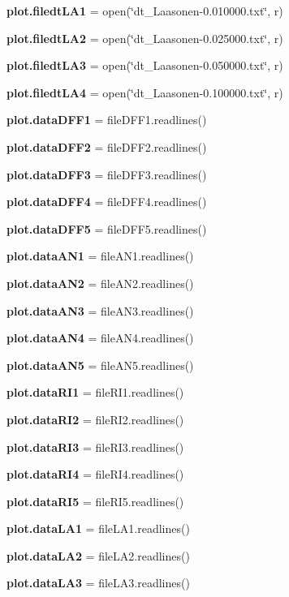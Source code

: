 \begin{DoxyCompactItemize}
\textbf{ plot.\+filedt\+L\+A1} = open(\char`\"{}dt\+\_\+\+Laasonen-\/0.\+010000.txt\char`\"{}, \textquotesingle{}r\textquotesingle{})
\item 
\textbf{ plot.\+filedt\+L\+A2} = open(\char`\"{}dt\+\_\+\+Laasonen-\/0.\+025000.txt\char`\"{}, \textquotesingle{}r\textquotesingle{})
\item 
\textbf{ plot.\+filedt\+L\+A3} = open(\char`\"{}dt\+\_\+\+Laasonen-\/0.\+050000.txt\char`\"{}, \textquotesingle{}r\textquotesingle{})
\item 
\textbf{ plot.\+filedt\+L\+A4} = open(\char`\"{}dt\+\_\+\+Laasonen-\/0.\+100000.txt\char`\"{}, \textquotesingle{}r\textquotesingle{})
\item 
\textbf{ plot.\+data\+D\+F\+F1} = file\+D\+F\+F1.\+readlines()
\item 
\textbf{ plot.\+data\+D\+F\+F2} = file\+D\+F\+F2.\+readlines()
\item 
\textbf{ plot.\+data\+D\+F\+F3} = file\+D\+F\+F3.\+readlines()
\item 
\textbf{ plot.\+data\+D\+F\+F4} = file\+D\+F\+F4.\+readlines()
\item 
\textbf{ plot.\+data\+D\+F\+F5} = file\+D\+F\+F5.\+readlines()
\item 
\textbf{ plot.\+data\+A\+N1} = file\+A\+N1.\+readlines()
\item 
\textbf{ plot.\+data\+A\+N2} = file\+A\+N2.\+readlines()
\item 
\textbf{ plot.\+data\+A\+N3} = file\+A\+N3.\+readlines()
\item 
\textbf{ plot.\+data\+A\+N4} = file\+A\+N4.\+readlines()
\item 
\textbf{ plot.\+data\+A\+N5} = file\+A\+N5.\+readlines()
\item 
\textbf{ plot.\+data\+R\+I1} = file\+R\+I1.\+readlines()
\item 
\textbf{ plot.\+data\+R\+I2} = file\+R\+I2.\+readlines()
\item 
\textbf{ plot.\+data\+R\+I3} = file\+R\+I3.\+readlines()
\item 
\textbf{ plot.\+data\+R\+I4} = file\+R\+I4.\+readlines()
\item 
\textbf{ plot.\+data\+R\+I5} = file\+R\+I5.\+readlines()
\item 
\textbf{ plot.\+data\+L\+A1} = file\+L\+A1.\+readlines()
\item 
\textbf{ plot.\+data\+L\+A2} = file\+L\+A2.\+readlines()
\item 
\textbf{ plot.\+data\+L\+A3} = file\+L\+A3.\+readlines()
\item 

\end{DoxyCompactItemize}
